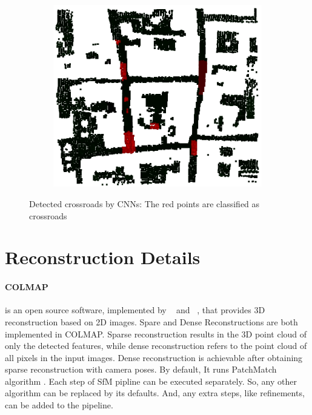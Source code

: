 \documentclass[11pt]{article}
\begin{document}
    \begin{figure}
    \centering
    \begin{subfigure}{0.45\textwidth}
        \includegraphics[width=\textwidth,keepaspectratio]{images/experiment/res_deep}
    \end{subfigure}
    \caption{Detected crossroads by CNNs: The red points are classified as crossroads}
    \label{fig:res_deep}
    \end{figure}

    \section{Reconstruction Details}

    \paragraph{COLMAP} is an open source software, implemented by ~\cite{schoenberger2016sfm} and ~\cite{schoenberger2016mvs},
    that provides 3D reconstruction based on 2D images. Spare and Dense Reconstructions are both implemented in COLMAP.
    Sparse reconstruction results in the 3D point cloud of only the detected features, while dense reconstruction
    refers to the point cloud of all pixels in the input images. Dense reconstruction is achievable after obtaining
    sparse reconstruction with camera poses. By default, It runs PatchMatch algorithm \cite{journals/tog/BarnesSFG09}.
    Each step of SfM pipline can be executed separately. So, any other algorithm can be replaced by
    its defaults. And, any extra steps, like refinements, can be added to the pipeline.
\end{document}
